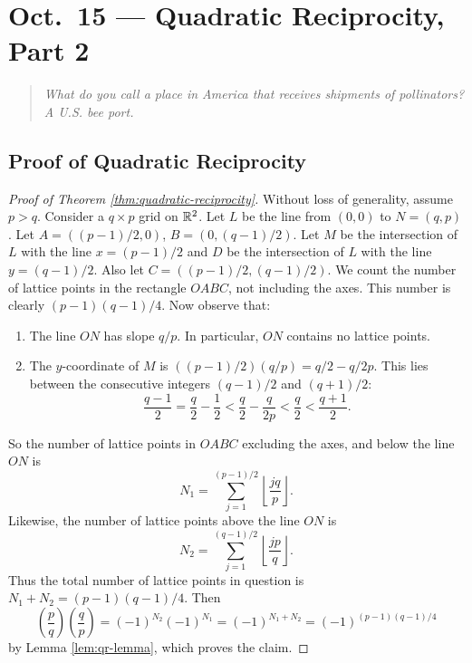 \chapter{Oct.~15 --- Quadratic Reciprocity, Part 2}

\begin{quote}
  \emph{What do you call a place in America that receives shipments of pollinators? A U.S. bee port.}
\end{quote}

\section{Proof of Quadratic Reciprocity}

\begin{proof}[Proof of Theorem \ref{thm:quadratic-reciprocity}]
  Without loss of generality, assume
  $p > q$.
  Consider a $q \times p$ grid on $\mathbb{R}^2$.
  Let $L$ be the line from
  $(0, 0)$ to $N = (q, p)$. Let
  $A = ((p - 1) / 2, 0)$,
  $B = (0, (q - 1) / 2)$. Let
  $M$ be the intersection of
  $L$ with the line
  $x = (p - 1) / 2$ and $D$ be the
  intersection of $L$ 
  with the line $y = (q - 1) / 2$.
  Also let $C = ((p - 1) / 2, (q - 1) / 2)$.
  We count the number of lattice points in
  the rectangle $OABC$, not including the
  axes.
  This number is clearly
  $(p - 1)(q - 1) / 4$. Now observe that:
  \begin{enumerate}
    \item The line $ON$ has slope
      $q / p$. In particular, $ON$
      contains no lattice points.
    \item The $y$-coordinate of $M$ is
      $((p - 1) / 2) (q / p) = q / 2 - q / 2p$.
      This lies between the consecutive
      integers
      $(q - 1) / 2$ and $(q + 1) / 2$:
      \[
        \frac{q - 1}{2} = \frac{q}{2} - \frac{1}{2}
        < \frac{q}{2} - \frac{q}{2p}
        < \frac{q}{2} < \frac{q + 1}{2}.
      \]
  \end{enumerate}
  So the number of lattice points
  in $OABC$ excluding the axes, and
  below the line $ON$ is
  \[
    N_1 = \sum_{j = 1}^{(p - 1) / 2}
    \left\lfloor \frac{jq}{p} \right\rfloor.
  \]
  Likewise, the number of lattice points
  above the line $ON$ is
  \[
    N_2 = \sum_{j = 1}^{(q - 1) / 2} \left\lfloor \frac{jp}{q} \right\rfloor.
  \]
  Thus the total number of lattice points
  in question is
  $N_1 + N_2 = (p - 1)(q - 1) / 4$. Then
  \[
    \left(\frac{p}{q}\right)
    \left(\frac{q}{p}\right)
    = (-1)^{N_2} (-1)^{N_1}
    = (-1)^{N_1 + N_2}
    = (-1)^{(p - 1)(q - 1) / 4}
  \]
  by Lemma \ref{lem:qr-lemma}, which
  proves the claim.
\end{proof}


